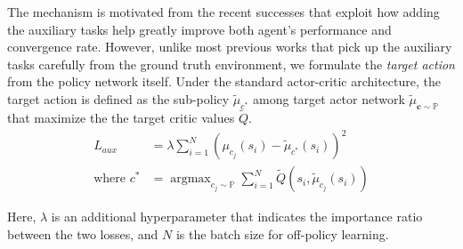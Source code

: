 \documentclass[../thesis.tex]{subfiles}
\begin{document}
The mechanism is motivated from the recent successes \cite{DBLP:journals/corr/GuLGTL16,mirowski2017a,lample2016playing,dosovitskiy2016learning} that exploit how adding the auxiliary tasks help greatly improve both agent's performance and convergence rate. However, unlike most previous works that pick up the auxiliary tasks carefully from the ground truth environment, we formulate the \textit{target action} from the policy network itself. 
Under the standard actor-critic architecture, the target action is defined as the sub-policy $\tilde{\mu}_{c^{*}}$ among target actor network $\tilde{\mu}_{\mathbf{c}\sim \mathbb{P}}$ that maximize the the target critic values $\tilde{Q}$.
\begin{align}
L_{aux} &= \lambda \sum_{i=1}^N (\mu_{c_j}(s_i)-\tilde{\mu}_{c^{*}}(s_i))^2 \\
\text{where  } c^{*} &= \mathop{\mathrm{argmax}}_{c_j \sim \mathbb{P}} \sum_{i=1}^N \tilde{Q}(s_i,\tilde{\mu}_{c_j}(s_i))
\end{align}

Here, $\lambda$ is an additional hyperparameter that indicates the importance ratio between the two losses, and $N$ is the batch size for off-policy learning.




\end{document}

